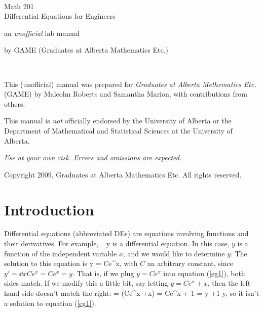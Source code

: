 \documentclass[12pt]{book}
\begin{document}

\pagestyle{empty}

\begin{center}
  \ \vspace{1in}

  \textsf{\LARGE Math 201} \\
  \vspace{0.2in}
  \textsf{\LARGE Differential Equations for Engineers}
  \vspace{2in}

  \textsf{\Huge an \emph{unofficial} lab manual}
  \vspace{2.5in}

  \textsf{\Large by GAME (Graduates at Alberta Mathematics Etc.)}
\end{center}

\newpage

\ \vspace{5in}

\noindent
This (unofficial) manual was prepared for \emph{Graduates at Alberta
  Methematics Etc.} (GAME) by Malcolm Roberts and Samantha Marion,
with contributions from others.
\vspace{0.5in}

\noindent
This manual is \emph{not} officially endorsed by the University of
Alberta or the Department of Mathematical and Statistical Sciences at
the University of Alberta.
\vspace{0.5in}

\noindent
\emph{Use at your own risk.  Errors and omissions are expected.}
\vspace{0.5in}

\noindent
Copyright 2009, Graduates at Alberta Mathematics Etc.  All rights
reserved.


\newpage
\pagestyle{plain}

\section*{Introduction}

Differential equations (abbreviated DEs) are equations involving functions and
their derivatives. For example,
\be \label{eg1}
 =y
\ee
is a differential equation. In this case, $y$ is a function of the independent
variable $x$, and we would like to determine $y$. The solution to this
equation is
\bee
y = Ce^x,
\eee
with $C$ an arbitrary constant, since $y'=\dd{}{x}Ce^x=Ce^x=y$. That is, if we
plug $y=Ce^x$ into equation (\ref{eg1}), both sides match. If we modify this
a little bit, say letting $y=Ce^x +x$, then the left hand side doesn't
match the right:
\bee
{} = (Ce^x +x) = Ce^x + 1 = y +1 \neq y,
\eee
so it isn't a solution to equation (\ref{eg1}).
\end{document}
